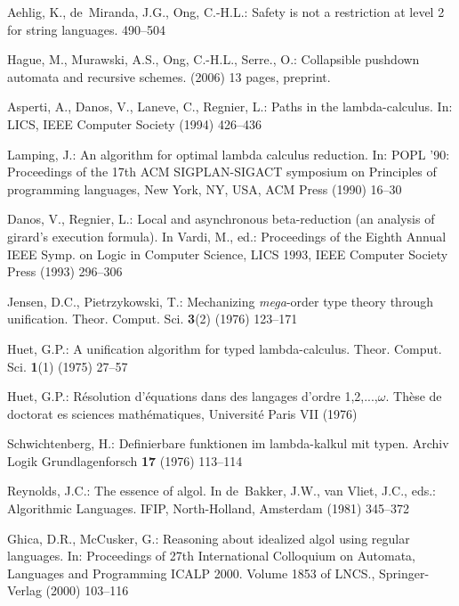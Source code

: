 \documentclass{llncs}
\begin{document}
\begin{thebibliography}{10}
Aehlig, K., de~Miranda, J.G., Ong, C.-H.L.:
\newblock Safety is not a restriction at level 2 for string languages.
\newblock  \cite{DBLP:conf/fossacs/2005}  490--504

Hague, M., Murawski, A.S., Ong, C.-H.L., Serre., O.:
\newblock Collapsible pushdown automata and recursive schemes.
\newblock (2006) 13 pages, preprint.

Asperti, A., Danos, V., Laneve, C., Regnier, L.:
\newblock Paths in the lambda-calculus.
\newblock In: LICS, IEEE Computer Society (1994)  426--436

Lamping, J.:
\newblock An algorithm for optimal lambda calculus reduction.
\newblock In: POPL '90: Proceedings of the 17th ACM SIGPLAN-SIGACT symposium on
  Principles of programming languages, New York, NY, USA, ACM Press (1990)
  16--30

Danos, V., Regnier, L.:
\newblock Local and asynchronous beta-reduction (an analysis of girard's
  execution formula).
\newblock In Vardi, M., ed.: Proceedings of the Eighth Annual IEEE Symp. on
  Logic in Computer Science, {LICS} 1993, IEEE Computer Society Press (1993)
  296--306

Jensen, D.C., Pietrzykowski, T.:
\newblock Mechanizing {\it mega}-order type theory through unification.
\newblock Theor. Comput. Sci. \textbf{3}(2) (1976)  123--171

Huet, G.P.:
\newblock A unification algorithm for typed lambda-calculus.
\newblock Theor. Comput. Sci. \textbf{1}(1) (1975)  27--57

Huet, G.P.:
\newblock R{\'e}solution d'{\'e}quations dans des langages d'ordre
  1,2,...,$\omega$.
\newblock Th{\`e}se de doctorat es sciences math{\'e}matiques, Universit{\'e}
  Paris VII (1976)

Schwichtenberg, H.:
\newblock Definierbare funktionen im lambda-kalkul mit typen.
\newblock Archiv Logik Grundlagenforsch \textbf{17} (1976)  113--114

Reynolds, J.C.:
\newblock The essence of algol.
\newblock In de~Bakker, J.W., van Vliet, J.C., eds.: Algorithmic Languages.
\newblock IFIP, North-Holland, Amsterdam (1981)  345--372

Ghica, D.R., McCusker, G.:
\newblock Reasoning about idealized {\sc algol} using regular languages.
\newblock In: Proceedings of 27th International Colloquium on Automata,
  Languages and Programming ICALP 2000. Volume 1853 of LNCS., Springer-Verlag
  (2000)  103--116


\end{thebibliography}
\end{document}
